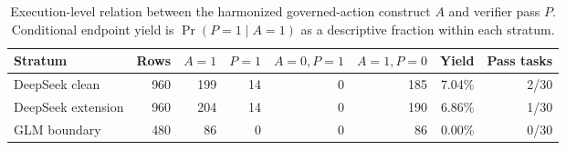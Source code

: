 
\begin{table}[H]
\centering
\caption{Execution-level relation between the harmonized governed-action construct $A$ and verifier pass $P$. Conditional endpoint yield is $\Pr(P=1\mid A=1)$ as a descriptive fraction within each stratum.}
\label{tab:criterion}
\small
\setlength{\tabcolsep}{4pt}
\begin{tabular}{@{}lrrrrrrr@{}}
\toprule
Stratum & Rows & $A{=}1$ & $P{=}1$ & $A{=}0,P{=}1$ & $A{=}1,P{=}0$ & Yield & Pass tasks \\
\midrule
DeepSeek clean & 960 & 199 & 14 & 0 & 185 & 7.04\% & 2/30 \\
DeepSeek extension & 960 & 204 & 14 & 0 & 190 & 6.86\% & 1/30 \\
GLM boundary & 480 & 86 & 0 & 0 & 86 & 0.00\% & 0/30 \\
\bottomrule
\end{tabular}
\end{table}
